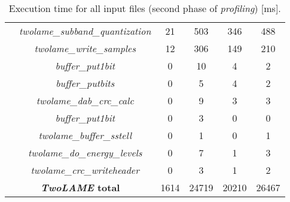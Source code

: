 \begin{table}[H]
\begin{tabular}{|c|c|c|c|c|c|}
    \cline{2-6}
    & \multicolumn{1}{c|}{\textit{twolame\_subband\_quantization}} & 21 & 503 & 346 & 488 \\
    \cline{2-6}
    & \multicolumn{1}{c|}{\textit{twolame\_write\_samples}} & 12 & 306 & 149 & 210 \\
    \cline{2-6}
    & \multicolumn{1}{c|}{\textit{buffer\_put1bit}} & 0 & 10 & 4 & 2 \\
    \cline{2-6}
    & \multicolumn{1}{c|}{\textit{buffer\_putbits}} & 0 & 5 & 4 & 2 \\
    \cline{2-6}
    & \multicolumn{1}{c|}{\textit{twolame\_dab\_crc\_calc}} & 0 & 9 & 3 &  3 \\
    \cline{2-6}
    & \multicolumn{1}{c|}{\textit{buffer\_put1bit}} & 0 & 3 & 0 &  0 \\
    \cline{2-6}
    & \multicolumn{1}{c|}{\textit{twolame\_buffer\_sstell}} & 0 & 1 & 0 & 1  \\
    \cline{2-6}
    & \multicolumn{1}{c|}{\textit{twolame\_do\_energy\_levels}} & 0 & 7 & 1 & 3  \\
    \cline{2-6}
    & \multicolumn{1}{c|}{\textit{twolame\_crc\_writeheader}} & 0 & 3 & 1 &  2  \\ 
    \hline
    \multicolumn{2}{|c|}{\textbf{\textit{TwoLAME} total}}  & 1614 & 24719 & 20210 & 26467 \\ 
    \hline
    \end{tabular}
    \caption{Execution time for all input files (second phase of \textit{profiling}) [ms].}
    \label{profiling2}
\end{table}

\vspace{1cm}

